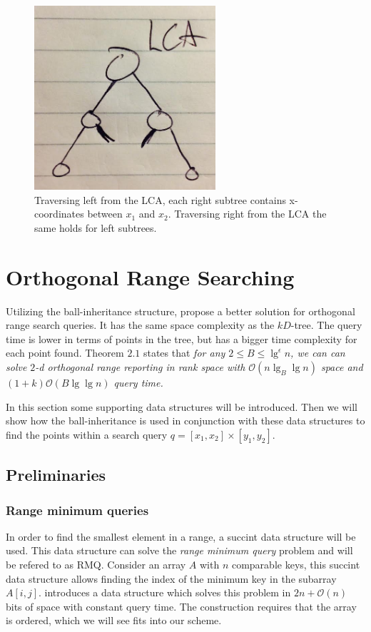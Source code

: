 \begin{figure}[H]
    \centering
    \includegraphics[width=0.6\textwidth]{pictures/LCA.png}
    \caption{Traversing left from the LCA, each right subtree contains x-coordinates between $x_1$ and $x_2$. Traversing right from the LCA the same holds for left subtrees.}
    \label{fig:LCA}
\end{figure}


\section{Orthogonal Range Searching}
\label{sect:original}
Utilizing the ball-inheritance structure, \citet{chanetal} propose a better solution for orthogonal range search queries. It has the same space complexity as the $kD$-tree. The query time is lower in terms of points in the tree, but has a bigger time complexity for each point found. Theorem $2.1$ states that \emph{for any $2 \leq B \leq \lg^\epsilon n$, we can can solve $2$-d orthogonal range reporting in rank space with $\mathcal{O}(n \lg_B \lg n)$ space and $(1+k)\mathcal{O}(B \lg \lg n)$ query time.}

In this section some supporting data structures will be introduced. Then we will show how the ball-inheritance is used in conjunction with these data structures to find the points within a search query $q = [x_1, x_2] \times [y_1, y_2]$.

\subsection{Preliminaries}

\subsubsection{Range minimum queries}
In order to find the smallest element in a range, a succint data structure will be used. This data structure can solve the \emph{range minimum query} problem and will be refered to as RMQ. 
Consider an array $A$ with $n$ comparable keys, this succint data structure allows finding the index of the minimum key in the subarray $A[i,j]$. \citet{fischer} introduces a data structure which solves this problem in $2n + \mathcal{O}(n)$ bits of space with constant query time. The construction requires that the array is ordered, which we will see fits into our scheme.

